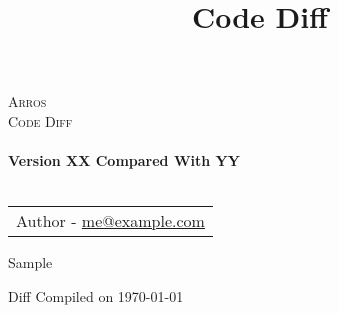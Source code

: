 \documentclass[10pt, oneside]{article}
\title{Code Diff}
\begin{document}
\sloppy

\begin{titlepage}

\center 
\textsc{\LARGE Arros}\\[1.5cm] 
\textsc{\Large Code Diff}\\[0.5cm] 

\HRule \\[0.4cm]
{ \huge \bfseries Version XX Compared With YY 
}\\[0.4cm] 
\HRule \\[1.5cm]


\begin{center}
\begin{tabular}{ c} 
Author - \href{mailto:me@example.com}{me@example.com}
\end{tabular}
\end{center}

\vfill
Sample

Diff Compiled on \today
\vfill 

\end{titlepage}


\tableofcontents

\lstlistoflistings

\newpage





\newpage




\appendix

\newpage



% 

\end{document}

